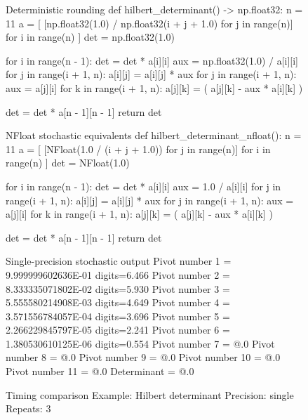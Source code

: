 \documentclass[manuscript, screen]{acmart}
\begin{document}
\begin{figure}[htp]
\centering
\begin{minipage}[t]{0.485\textwidth}
\vspace{0pt}
\begin{pythoncode}{Deterministic rounding}
def hilbert_determinant() -> np.float32:
    n = 11
    a = [
        [np.float32(1.0) / np.float32(i + j + 1.0)
         for j in range(n)]
        for i in range(n)
    ]
    det = np.float32(1.0)

    for i in range(n - 1):
        det = det * a[i][i]
        aux = np.float32(1.0) / a[i][i]
        for j in range(i + 1, n):
            a[i][j] = a[i][j] * aux
        for j in range(i + 1, n):
            aux = a[j][i]
            for k in range(i + 1, n):
                a[j][k] = (
                    a[j][k]
                    - aux * a[i][k]
                )

    det = det * a[n - 1][n - 1]
    return det
\end{pythoncode}
\end{minipage}
\hfill
\begin{minipage}[t]{0.485\textwidth}
\vspace{0pt}
\begin{pythoncode}{NFloat stochastic equivalents}
def hilbert_determinant_nfloat():
    n = 11
    a = [
        [NFloat(1.0 / (i + j + 1.0))
         for j in range(n)]
        for i in range(n)
    ]
    det = NFloat(1.0)

    for i in range(n - 1):
        det = det * a[i][i]
        aux = 1.0 / a[i][i]
        for j in range(i + 1, n):
            a[i][j] = a[i][j] * aux
        for j in range(i + 1, n):
            aux = a[j][i]
            for k in range(i + 1, n):
                a[j][k] = (
                    a[j][k]
                    - aux * a[i][k]
                )

    det = det * a[n - 1][n - 1]
    return det
\end{pythoncode}
\end{minipage}

\begin{minipage}[t]{0.60\linewidth}
\vspace{0.8em}
\begin{codeoutput}{Single-precision stochastic output}
Pivot number  1 = 9.999999602636E-01  digits=6.466
Pivot number  2 = 8.333335071802E-02  digits=5.930
Pivot number  3 = 5.555580214908E-03  digits=4.649
Pivot number  4 = 3.571556784057E-04  digits=3.696
Pivot number  5 = 2.266229845797E-05  digits=2.241
Pivot number  6 = 1.380530610125E-06  digits=0.554
Pivot number  7 = @.0
Pivot number  8 = @.0
Pivot number  9 = @.0
Pivot number 10 = @.0
Pivot number 11 = @.0
Determinant = @.0
\end{codeoutput}
\end{minipage}
\hfill
\begin{minipage}[t]{0.36\linewidth}
\vspace{0.8em}
\begin{codeoutput}{Timing comparison}
Example: Hilbert determinant
Precision: single
Repeats: 3


\end{codeoutput}
\end{minipage}
\end{figure}
\end{document}
